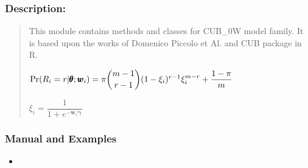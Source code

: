 \documentclass[letterpaper,10pt,english]{sphinxmanual}
\begin{document}
\subsubsection{Description:}
\label{\detokenize{cubmods:id75}}\begin{quote}

\sphinxAtStartPar
This module contains methods and classes
for CUB\_0W model family.
It is based upon the works of Domenico
Piccolo et Al. and CUB package in R.

\sphinxAtStartPar
\(\Pr(R_i=r|\pmb{\theta} ; \pmb w_i) = \pi \dbinom{m-1}{r-1}(1-\xi_i)^{r-1}\xi_i^{m-r}+\dfrac{1-\pi}{m}\)

\sphinxAtStartPar
\(\xi_i = \dfrac{1}{1+e^{-\pmb w_i \pmb\gamma}}\)
\end{quote}


\subsubsection{Manual and Examples}
\label{\detokenize{cubmods:id76}}\begin{itemize}
\item {} 
\sphinxAtStartPar
{}

\end{itemize}
\end{document}
